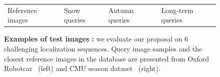 \begin{figure}
\begin{minipage}{0.555\linewidth}
		\scriptsize
		\begin{tabularx}{\linewidth}{X X X X}
			Reference images & Snow queries & Autumn queries & Long-term queries 
		\end{tabularx}
	\end{minipage}

	\caption[Examples of test images]{\label{fig:dataset} \textbf{Examples of test images :} we evaluate our proposal on 6 challenging localization sequences. Query image samples and the closest reference images in the database are presented from Oxford Robotcar~\cite{Maddern2016} (left) and CMU season dataset~\cite{Bansal2014a} (right).}
	
\end{figure}
